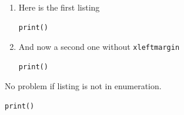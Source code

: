 \documentclass[a4paper,11pt]{article}
\begin{document}
\begin{enumerate}
\item Here is the first listing
\begin{lstlisting}[caption=Some caption]
print() 
\end{lstlisting}

\item And now a second one without \texttt{xleftmargin}
\begin{lstlisting}[xleftmargin=0pt,caption=Some caption]
print() 
\end{lstlisting}
\end{enumerate}

No problem if listing is not in enumeration.

\begin{lstlisting}[caption=Some caption]
print() 
\end{lstlisting}
\end{document}
